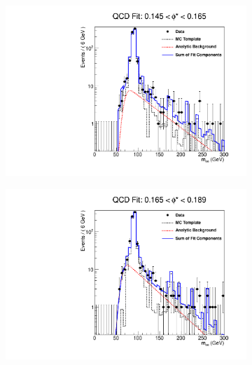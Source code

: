 \begin{figure}[!htbp]
    \centering
    \begin{subfigure}[b]{\SideBySidePlotWidth}
        \includegraphics[width=\linewidth]{figures/qcd_fits/qcd_fit_plot_for_21.pdf}
        \caption{}
        \label{fig:qcd_fit_21}
    \end{subfigure}%
    \begin{subfigure}[b]{\SideBySidePlotWidth}
        \includegraphics[width=\linewidth]{figures/qcd_fits/qcd_fit_plot_for_22.pdf}
        \caption{}
        \label{fig:qcd_fit_22}
    \end{subfigure}
    \begin{subfigure}[b]{\SideBySidePlotWidth}

\end{subfigure}
\end{figure}
